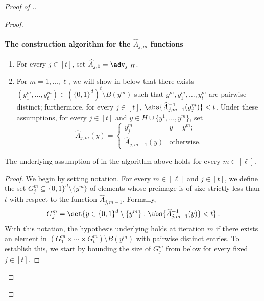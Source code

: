 \documentclass{toc}
\begin{document}
\begin{proof}[Proof of .]
\begin{proof}
\paragraph{The construction algorithm for the $\widehat{A}_{j,m}$ functions}
\begin{enumerate}
  	\item\label{it:assump1} For every $j \in [t]$, set $\widehat{A}_{j,0} = \adv_{j}|_{H}$. 
%
  	\item\label{it:assump2} For $m = 1,\ldots, \ell$, we will show in  below that there exists $(y^m_{1},\ldots,y^m_{t})\in (\{0,1\}^d)^t \setminus B(y^m)$ such that $y^m, y^m_{1},\ldots,y^m_{t}$ are pairwise distinct; furthermore, for every $j \in [t]$, $\abs{\widehat{A}_{j,m-1}^{-1}(y^m_{j})} < t$. Under these assumptions, for every $j \in [t]$ and $y \in H \cup \{y^1,\ldots, y^m\}$, set 
  	\[\widehat{A}_{j,m}(y) = \begin{cases}
  	y^m_{j} &  y = y^m; \\
  	\widehat{A}_{j,m-1}(y) & \text{otherwise}.
  	\end{cases}\]



\end{enumerate}

\begin{claim}\label{c:step 2}
	The underlying assumption of  in the algorithm above holds for every $m \in [\ell]$.
\end{claim}

\begin{proof}
We begin by setting  notation.
For every $m \in [\ell]$ and $j \in [t]$, we define the set $G_j^m \subseteq \{0,1\}^d \setminus \{ y^m\}$ of elements whose preimage is of size strictly less than $t$ with respect to the function $\widehat{A}_{j,m-1}$. Formally,
\[G_j^m = \set{y \in \{0,1\}^d \setminus \{ y^m\} : \abs{{\widehat{A}_{j,m-1}}^{-1}(y)} < t}\,.\]
With this notation, the hypothesis underlying  holds at iteration $m$ if there exists an element in $(G_1^m \times \cdots \times G_t^m) \setminus B(y^m)$ with pairwise distinct entries. To establish this, we start by bounding the size of $G_j^m$ from below for every fixed $j \in [t]$.


\end{proof}
\end{proof}
\end{proof}
\end{document}
